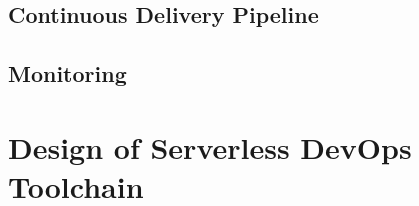 \subsection{Continuous Delivery Pipeline}
\subsection{Monitoring}
\section{Design of Serverless DevOps Toolchain}

